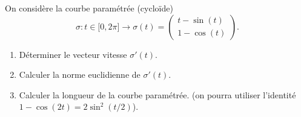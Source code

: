 
\begin{exercice}\label{exoOutilsMath-0126}

    On considère la courbe paramétrée (cycloïde)
    \begin{equation}
        \sigma\colon t\in\mathopen[ 0 , 2\pi \mathclose]\to \sigma(t)=\begin{pmatrix}
            t-\sin(t)    \\ 
            1-\cos(t)    
        \end{pmatrix}.
    \end{equation}
    \begin{enumerate}
        \item
            Déterminer le vecteur vitesse \( \sigma'(t)\).
        \item
            Calculer la norme euclidienne de \( \sigma'(t)\).
        \item
            Calculer la longueur de la courbe paramétrée. (on pourra utiliser l'identité \( 1-\cos(2t)=2\sin^2(t/2)\)).
    \end{enumerate}

\end{exercice}
